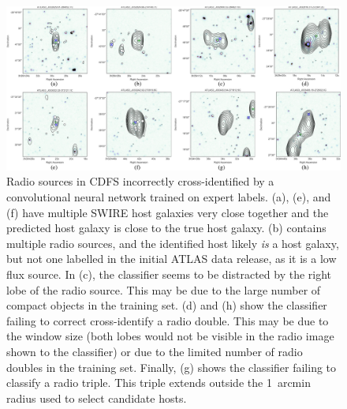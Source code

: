 \documentclass[fleqn,usenatbib,usedcolumn]{mnras}
\begin{document}
  \begin{figure}
  \includegraphics[width=\textwidth]{images/CNN-examples-CDFS.png}
      \caption{Radio sources in CDFS incorrectly cross-identified by a
        convolutional neural network trained on expert labels.
        (a), (e), and (f) have multiple SWIRE host galaxies very close
        together and the predicted host galaxy is close to the true host galaxy.
        (b) contains multiple radio sources, and the
        identified host likely \emph{is} a host galaxy, but not one labelled in
        the initial ATLAS data release, as it is a low flux source. In
        (c), the classifier seems to be distracted by the
        right lobe of the radio source. This may be due to the large number of
        compact objects in the training set.
        (d) and (h) show the
        classifier failing to correct cross-identify a radio double. This may be
        due to the window size (both lobes would not be visible in the radio image
        shown to the classifier) or due to the limited number of radio doubles in
        the training set. Finally,
       (g) shows the classifier failing to classify a radio
        triple. This triple extends outside the 1~arcmin radius used to select
        candidate hosts.}\label{fig:cnnexamples}
  \end{figure}


\end{document}
